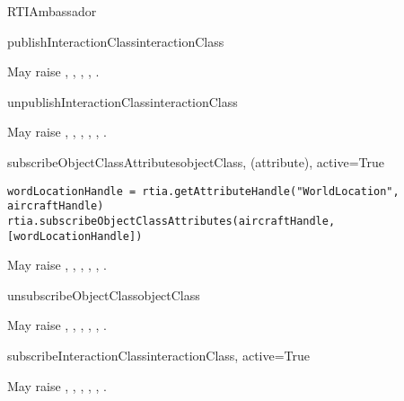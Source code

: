 \begin{classdesc}{RTIAmbassador}{}
\begin{methoddesc}{publishInteractionClass}{interactionClass}

May raise
,
,
,
,
.
\end{methoddesc}

\begin{methoddesc}{unpublishInteractionClass}{interactionClass}

May raise
,
,
,
,
,
.
\end{methoddesc}

\begin{methoddesc}{subscribeObjectClassAttributes}{objectClass, (attribute), active=True}

\begin{verbatim} 
wordLocationHandle = rtia.getAttributeHandle("WorldLocation", aircraftHandle)
rtia.subscribeObjectClassAttributes(aircraftHandle, [wordLocationHandle])
\end{verbatim}

May raise
,
,
,
,
,
.
\end{methoddesc}

\begin{methoddesc}{unsubscribeObjectClass}{objectClass}

May raise
,
,
,
,
,
.
\end{methoddesc}

\begin{methoddesc}{subscribeInteractionClass}{interactionClass, active=True}

May raise
,
,
,
,
,
.
\end{methoddesc}


\end{classdesc}
